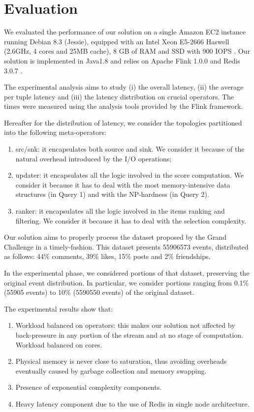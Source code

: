 \section{Evaluation}
\label{sec:evaluation}

We evaluated the performance of our solution on a single Amazon EC2 instance running Debian 8.3 (Jessie), equipped with an Intel Xeon E5-2666 Haswell (2.6GHz, 4 cores and 25MB cache), 8 GB of RAM and SSD with 900 IOPS \cite{AWSEC2InstanceTypes}. 
Our solution is implemented in Java1.8 and relies on Apache Flink 1.0.0 \cite{Flink} and Redis 3.0.7 \cite{Redis}.

The experimental analysis aims to study (i) the overall latency, (ii) the average per tuple latency and (iii) the latency distribution on crucial operators. The times were measured using the analysis tools provided by the Flink framework.

Hereafter for the distribution of latency, we consider the topologies partitioned into the following meta-operators: 

\begin{enumerate}
	\item src/snk: it encapsulates both source and sink. We consider it because of the natural overhead introduced by the I/O operations;
	\item updater: it encapsulates all the logic involved in the score computation. We consider it because it has to deal with the most memory-intensive data structures (in Query 1) and with the NP-hardness (in Query 2).
	\item ranker: it encapsulates all the logic involved in the items ranking and filtering. We consider it because it has to deal with the selection complexity.
\end{enumerate}

Our solution aims to properly process the dataset proposed by the Grand Challenge in a timely-fashion. This dataset presents 55906573 events, distributed as follows:  44\% comments, 39\% likes, 15\% posts and 2\% friendships.

In the experimental phase, we considered portions of that dataset, preserving the original event distribution. In particular, we consider portions ranging from 0.1\% (55905 events) to 10\% (5590550 events) of the original dataset.

The experimental results show that:

\begin{enumerate}
	\item Workload balanced on operators: this makes our solution not affected by back-pressure in any portion of the stream and at no stage of computation.
	Workload balanced on cores.
	
	\item Physical memory is never close to saturation, thus avoiding overheads eventually caused by garbage collection and memory swapping.
	
	\item Presence of exponential complexity components.
	
	\item Heavy latency component due to the use of Redis in single node architecture.
\end{enumerate}